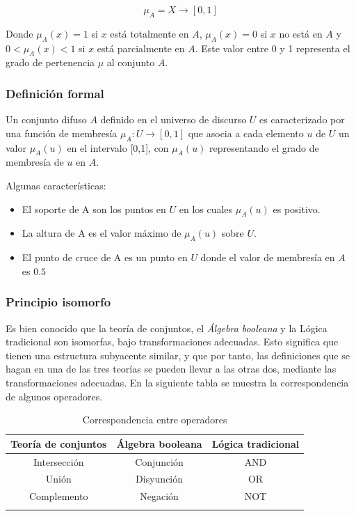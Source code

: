 \begin{displaymath}
\mu_A = X \rightarrow \left[ 0,1 \right]
\end{displaymath}


Donde $\mu_A(x) = 1$ si $x$ está totalmente en $A$,
$\mu_A(x) = 0$ si $x$ no está en $A$
y $ 0 < \mu_A(x) < 1 $ si $x$ está parcialmente en $A$.
Este valor entre 0 y 1 representa el grado de pertenencia $\mu$ al conjunto $A$.


\subsubsection{Definición formal}
Un conjunto difuso $A$ definido en el universo de discurso $U$ es caracterizado por una función de membresía $\mu_A : U \rightarrow [0,1]$ que asocia a cada elemento $u$ de $U$ un valor $\mu_A(u)$ en el intervalo [0,1], con $\mu_A(u)$ representando el grado de membresía de $u$ en $A$.

Algunas características:
{\setlength{\baselineskip}{0.7\baselineskip}\begin{itemize}
	\item El soporte de A son los puntos en $U$ en los cuales $\mu_A(u)$ es positivo.
	\item La altura de A es el valor máximo de $\mu_A(u)$ sobre $U$.
	\item El punto de cruce de A es un punto en $U$ donde el valor de membresía en $A$ es $0.5$
\end{itemize}}





\subsubsection{Principio isomorfo}

Es bien conocido que la teoría de conjuntos, el \textit{Álgebra booleana} y la Lógica tradicional son isomorfas, bajo transformaciones adecuadas. Esto significa que tienen una estructura subyacente similar, y que por tanto, las definiciones que se hagan en una de las tres teorías se pueden llevar a las otras dos, mediante las transformaciones adecuadas.
En la siguiente tabla se muestra la correspondencia de algunos operadores.

\begin{longtable}{|c|c|c|} 
	\hline
	Teoría de conjuntos & Álgebra booleana & Lógica tradicional \\ \hline
	Intersección & Conjunción & AND \\ \hline
	Unión & Disyunción & OR \\ \hline
	Complemento & Negación & NOT \\ \hline
	\caption{Correspondencia entre operadores} \label{table:tblop}
\end{longtable}

